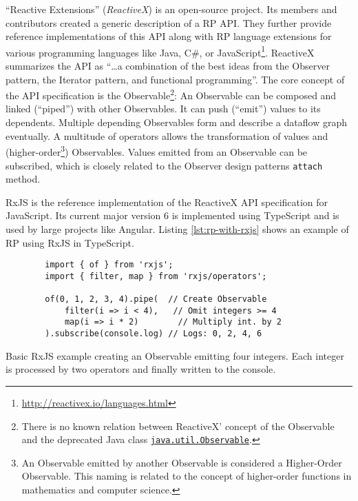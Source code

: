 \documentclass[sigplan,screen,review]{acmart}
\begin{document}
``Reactive Extensions'' (\emph{ReactiveX}) is an open-source project. Its members and contributors created a generic description of a RP API. They further provide reference implementations of this API along with RP language extensions for various programming languages like Java, C\#, or JavaScript\footnote{\url{http://reactivex.io/languages.html}}. ReactiveX summarizes the API as ``\dots a combination of the best ideas from the Observer pattern, the Iterator pattern, and functional programming''\cite{reactivex}. The core concept of the API specification is the Observable\footnote{There is no known relation between ReactiveX' concept of the Observable and the deprecated Java class \href{https://docs.oracle.com/en/java/javase/11/docs/api/java.base/java/util/Observable.html}{\texttt{java.util.Observable}}.}: An Observable can be composed and linked (``piped'') with other Observables. It can push (``emit'') values to its dependents. Multiple depending Observables form and describe a dataflow graph eventually. A multitude of operators allows the transformation of values and (higher-order\footnote{An Observable emitted by another Observable is considered a Higher-Order Observable. This naming is related to the concept of higher-order functions in mathematics and computer science.}) Observables. Values emitted from an Observable can be subscribed, which is closely related to the Observer design patterns \texttt{attach} method.

RxJS\cite{rxjs} is the reference implementation of the ReactiveX API specification for JavaScript. Its current major version 6 is implemented using TypeScript and is used by large projects like Angular\cite{angualrrxjs}. Listing \ref{lst:rp-with-rxjs} shows an example of RP using RxJS in TypeScript.

\begin{listing}
	\begin{verbatim}
		import { of } from 'rxjs';
		import { filter, map } from 'rxjs/operators';

		of(0, 1, 2, 3, 4).pipe(  // Create Observable
			filter(i => i < 4),	  // Omit integers >= 4
			map(i => i * 2)        // Multiply int. by 2
		).subscribe(console.log) // Logs: 0, 2, 4, 6
	\end{verbatim}
	\caption{Basic RxJS example creating an Observable emitting four integers. Each integer is processed by two operators and finally written to the console.}
	\label{lst:rp-with-rxjs}
\end{listing}
\end{document}
